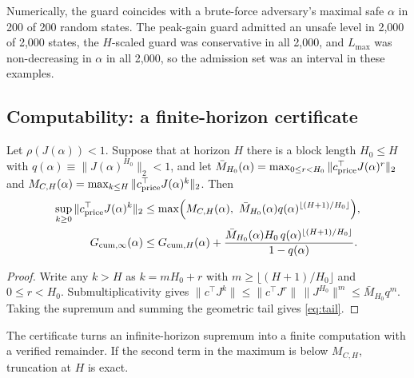 Numerically, the guard coincides with a brute-force adversary's maximal safe $\alpha$ in 200 of 200 random states. The peak-gain guard admitted an unsafe level in 2,000 of 2,000 states, the $H$-scaled guard was conservative in all 2,000, and $L_{\max}$ was non-decreasing in $\alpha$ in all 2,000, so the admission set was an interval in these examples.

\subsection{Computability: a finite-horizon certificate}

\begin{lemma}\label{lem:tail}
Let $\rho(J(\alpha))<1$. Suppose that at horizon $H$ there is a block length $H_0\le H$ with $q(\alpha)\equiv\|J(\alpha)^{H_0}\|_2<1$, and let $\bar M_{H_0}(\alpha)=\max_{0\le r<H_0}\|c^\top_{\rm price}J(\alpha)^r\|_2$ and $M_{C,H}(\alpha)=\max_{k\le H}\|c^\top_{\rm price}J(\alpha)^k\|_2$. Then
\begin{align}
\sup_{k\ge0}\|c^\top_{\rm price}J(\alpha)^k\|_2&\le\max\Bigl(M_{C,H}(\alpha),\ \bar M_{H_0}(\alpha)q(\alpha)^{\lfloor(H+1)/H_0\rfloor}\Bigr),\label{eq:tail}\\
G_{{\rm cum},\infty}(\alpha)&\le G_{{\rm cum},H}(\alpha)+\frac{\bar M_{H_0}(\alpha)H_0\,q(\alpha)^{\lfloor(H+1)/H_0\rfloor}}{1-q(\alpha)}.\notag
\end{align}
\end{lemma}

\begin{proof}
Write any $k>H$ as $k=mH_0+r$ with $m\ge\lfloor(H+1)/H_0\rfloor$ and $0\le r<H_0$. Submultiplicativity gives $\|c^\top J^k\|\le\|c^\top J^r\|\,\|J^{H_0}\|^m\le\bar M_{H_0}q^m$. Taking the supremum and summing the geometric tail gives \eqref{eq:tail}.
\end{proof}

The certificate turns an infinite-horizon supremum into a finite computation with a verified remainder. If the second term in the maximum is below $M_{C,H}$, truncation at $H$ is exact.

